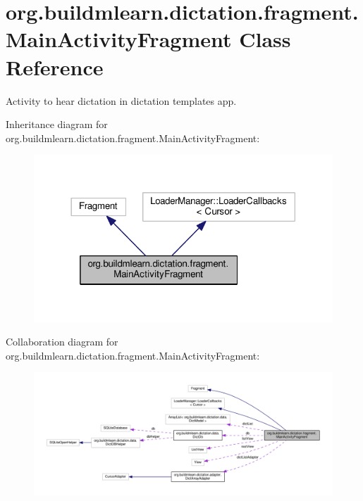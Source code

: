 \hypertarget{classorg_1_1buildmlearn_1_1dictation_1_1fragment_1_1MainActivityFragment}{}\section{org.\+buildmlearn.\+dictation.\+fragment.\+Main\+Activity\+Fragment Class Reference}
\label{classorg_1_1buildmlearn_1_1dictation_1_1fragment_1_1MainActivityFragment}


Activity to hear dictation in dictation template\textquotesingle{}s app.  




Inheritance diagram for org.\+buildmlearn.\+dictation.\+fragment.\+Main\+Activity\+Fragment\+:
\nopagebreak
\begin{figure}[H]
\begin{center}
\leavevmode
\includegraphics[width=318pt]{classorg_1_1buildmlearn_1_1dictation_1_1fragment_1_1MainActivityFragment__inherit__graph}
\end{center}
\end{figure}


Collaboration diagram for org.\+buildmlearn.\+dictation.\+fragment.\+Main\+Activity\+Fragment\+:
\nopagebreak
\begin{figure}[H]
\begin{center}
\leavevmode
\includegraphics[width=350pt]{classorg_1_1buildmlearn_1_1dictation_1_1fragment_1_1MainActivityFragment__coll__graph}
\end{center}
\end{figure}

